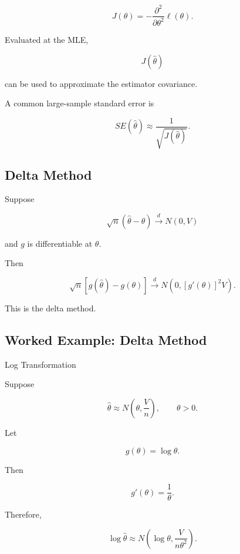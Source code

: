 \[
\boxed{
J(\theta)
=
-
\frac{
\partial^2
}{
\partial\theta^2
}
\ell(\theta).
}
\]

Evaluated at the MLE,

\[
\boxed{
J(\widehat{\theta})
}
\]

can be used to approximate the estimator covariance.

A common large-sample standard error is

\[
\boxed{
SE(\widehat{\theta})
\approx
\frac1{
\sqrt{
J(\widehat{\theta})
}
}.
}
\]

\subsection{Delta Method}
\label{subsec:delta-method-mathstat}

Suppose

\[
\sqrt{n}
(
\widehat{\theta}-\theta
)
\xrightarrow{d}
N(0,V)
\]

and \(g\) is differentiable at \(\theta\).

Then

\[
\boxed{
\sqrt{n}
[
g(\widehat{\theta})-g(\theta)
]
\xrightarrow{d}
N
\left(
0,
[g'(\theta)]^2V
\right).
}
\]

This is the delta method.

\subsection{Worked Example: Delta Method}
\label{subsec:worked-delta-method}

\begin{workedexamplebox}{Log Transformation}

Suppose

\[
\widehat{\theta}
\approx
N
\left(
\theta,
\frac{V}{n}
\right),
\qquad
\theta>0.
\]

Let

\[
g(\theta)=\log\theta.
\]

Then

\[
g'(\theta)=\frac1\theta.
\]

Therefore,

\begin{answerbox}
\[
\boxed{
\log\widehat{\theta}
\approx
N
\left(
\log\theta,
\frac{
V
}{
n\theta^2
}
\right).
}
\]
\end{answerbox}

\end{workedexamplebox}

